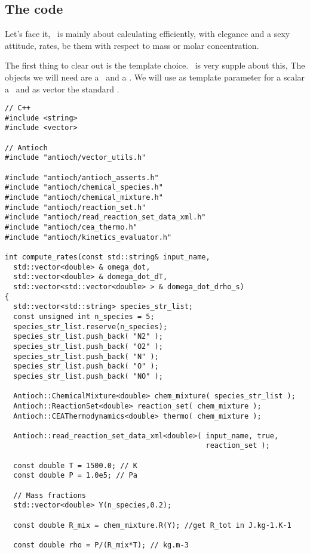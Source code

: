 \subsection{The code}

Let's face it, \Antioch\ is mainly about calculating
efficiently, with elegance and a sexy attitude, rates,
be them with respect to mass or molar concentration. 

The first thing to clear out is the template choice. 
\Antioch\ is very supple about this, 
The objects we will need are
a \ReactionSet\ and a \KineticsEvaluator. We will
use as template parameter for a scalar a \double\
and as vector the standard \stdvector.

\linenumbers
\begin{verbatim}
// C++
#include <string>
#include <vector>

// Antioch
#include "antioch/vector_utils.h"

#include "antioch/antioch_asserts.h"
#include "antioch/chemical_species.h"
#include "antioch/chemical_mixture.h"
#include "antioch/reaction_set.h"
#include "antioch/read_reaction_set_data_xml.h"
#include "antioch/cea_thermo.h"
#include "antioch/kinetics_evaluator.h"

int compute_rates(const std::string& input_name,
  std::vector<double> & omega_dot,
  std::vector<double> & domega_dot_dT,
  std::vector<std::vector<double> > & domega_dot_drho_s)
{
  std::vector<std::string> species_str_list;
  const unsigned int n_species = 5;
  species_str_list.reserve(n_species);
  species_str_list.push_back( "N2" );
  species_str_list.push_back( "O2" );
  species_str_list.push_back( "N" );
  species_str_list.push_back( "O" );
  species_str_list.push_back( "NO" );

  Antioch::ChemicalMixture<double> chem_mixture( species_str_list );
  Antioch::ReactionSet<double> reaction_set( chem_mixture );
  Antioch::CEAThermodynamics<double> thermo( chem_mixture );

  Antioch::read_reaction_set_data_xml<double>( input_name, true, 
                                               reaction_set );

  const double T = 1500.0; // K
  const double P = 1.0e5; // Pa

  // Mass fractions
  std::vector<double> Y(n_species,0.2);

  const double R_mix = chem_mixture.R(Y); //get R_tot in J.kg-1.K-1

  const double rho = P/(R_mix*T); // kg.m-3


\end{verbatim}
